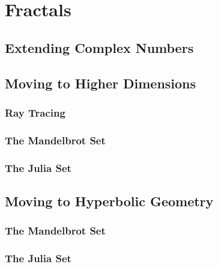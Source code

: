\chapter{Fractals}

\section{Extending Complex Numbers}
\section{Moving to Higher Dimensions}
\subsection{Ray Tracing}
\subsection{The Mandelbrot Set}
\subsection{The Julia Set}

\section{Moving to Hyperbolic Geometry}
\subsection{The Mandelbrot Set}
\subsection{The Julia Set}
